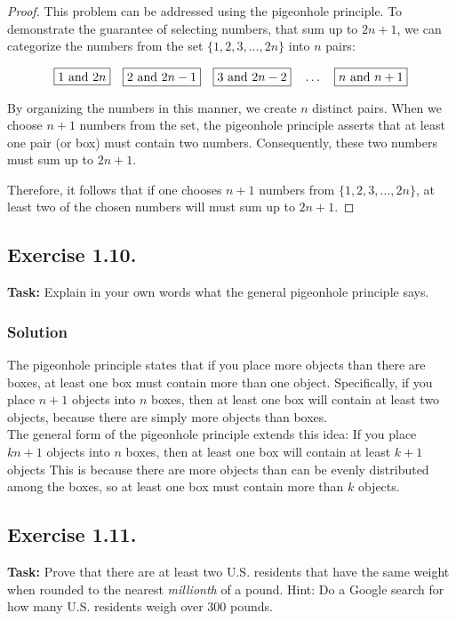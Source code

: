 \documentclass{article}
\begin{document}
\begin{proof}
    This problem can be addressed using the pigeonhole principle. To demonstrate the guarantee of selecting numbers, that sum up to $2n + 1$, we can categorize the numbers from the set $\{1, 2, 3, \ldots, 2n\}$ into $n$ pairs:

    \[
    \fbox{$1$ and $2n$} \quad \fbox{$2$ and $2n-1$} \quad \fbox{$3$ and $2n-2$} \quad \dots \quad \fbox{$n$ and $n+1$}
    \]

    By organizing the numbers in this manner, we create $n$ distinct pairs. When we choose $n + 1$ numbers from the set, the pigeonhole principle asserts that at least one pair (or box) must contain two numbers. Consequently, these two numbers must sum up to $2n+1$.

    Therefore, it follows that if one chooses $n + 1$ numbers from $\{1, 2, 3, \ldots, 2n\}$, at least two of the chosen numbers will must sum up to $2n+1$.
\end{proof}

\newpage

\subsection{Exercise 1.10.}
\textbf{Task:} Explain in your own words what the general pigeonhole principle says. 

\subsubsection*{Solution}

The pigeonhole principle states that if you place more objects than there are boxes, at least one box must contain more than one object. Specifically, if you place $n+1$ objects into $n$ boxes, then at least one box will contain at least two objects, because there are simply more objects than boxes. \\
The general form of the pigeonhole principle extends this idea: If you place $kn+1$ objects into $n$ boxes, then at least one box will contain at least $k+1$ objects This is because there are more objects than can be evenly distributed among the boxes, so at least one box must contain more than $k$ objects.

\subsection{Exercise 1.11.}
\textbf{Task:} Prove that there are at least two U.S. residents that have the same weight when rounded to the nearest \textit{millionth} of a pound. Hint: Do a Google search for how many U.S. residents weigh over 300 pounds.
\end{document}
